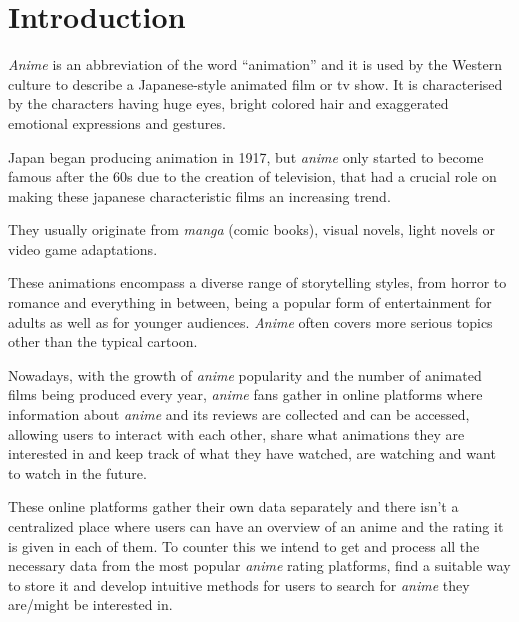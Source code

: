 \documentclass[twocolumn,twoside,11pt,a4paper]{article}
\begin{document}
\section{Introduction}\label{intro}
\textit{Anime} is an abbreviation of the word “animation” and it is used by the Western culture to describe a Japanese-style animated film or tv show. It is characterised by the characters having huge eyes, bright colored hair and exaggerated emotional expressions and gestures.
\par
Japan began producing animation in 1917, but \textit{anime} only started to become famous after the 60s due to the creation of television, that had a crucial role on making these japanese characteristic films an increasing trend. 
\par
They usually originate from \textit{manga} (comic books), visual novels, light novels or video game adaptations. 
\par
These animations encompass a diverse range of storytelling styles, from horror to romance and everything in between, being a popular form of entertainment for adults as well as for younger audiences. \textit{Anime} often covers more serious topics other than the typical cartoon.
\par
Nowadays, with the growth of \textit{anime} popularity and the number of animated films being produced every year, \textit{anime} fans gather in online platforms where information about \textit{anime} and its reviews are collected and can be accessed, allowing users to interact with each other, share what animations they are interested in and keep track of what they have watched, are watching and want to watch in the future. 
\par
These online platforms gather their own data separately and there isn’t a centralized place where users can have an overview of an anime and the rating it is given in each of them. To counter this we intend to get and process all the necessary data from the most popular \textit{anime} rating platforms, find a suitable way to store it and develop intuitive methods for users to search for \textit{anime} they are/might be interested in.

\end{document}
